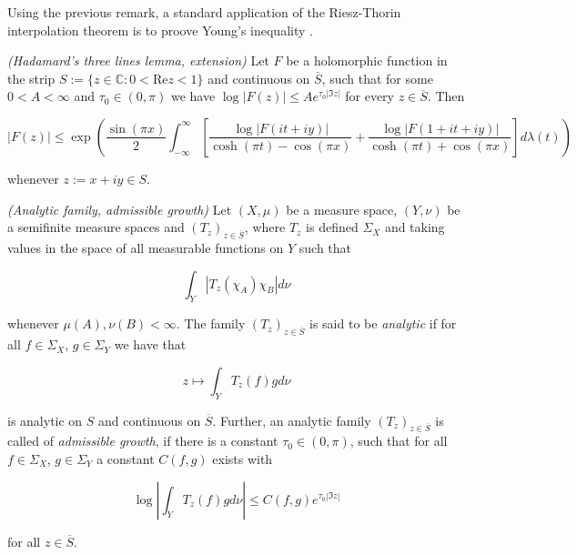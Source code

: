 \begin{remark*}
	Using the previous remark, a standard application of the Riesz-Thorin interpolation theorem is to proove Young's inequality \textup{\cite[22--23]{grafakos:fourier:2014}}.
\end{remark*}

\begin{mdframed}
	\begin{lemma}\emph{(Hadamard's three lines lemma, extension)}
		Let $F$ be a holomorphic function in the strip $S := \{z \in \mathbb{C}: 0 < \mathrm{Re}z < 1\}$ and continuous on $\overline{S}$, such that for some $0 < A < \infty$ and $\tau_0 \in (0,\pi)$ we have $\log \vert F(z)\vert \leqslant A e^{\tau_0 \vert \Im z \vert}$ for every $z \in \overline{S}$. Then

			\begin{equation*}
				\vert F(z) \vert \leqslant \exp\left( \frac{\sin(\pi x)}{2} \int_{-\infty}^\infty \left[ \frac{\log \vert F(it + iy)\vert}{\cosh(\pi t) - \cos(\pi x)} + \frac{\log \vert F(1 + it + iy)\vert}{\cosh(\pi t) + \cos(\pi x)} \right] d\lambda(t)\right)
			\end{equation*}

			whenever $z := x + iy \in S$.
			\label{lem:EHTL}
	\end{lemma}
\end{mdframed}

\vspace{2mm}

\begin{mdframed}
	\begin{definition}\emph{(Analytic family, admissible growth)}
		Let $(X,\mu)$ be a measure space, $(Y,\nu)$ be a semifinite measure spaces and $\left( T_z \right)_{z \in \overline{S}}$, where $T_z$ is defined $\Sigma_X$ and taking values in the space of all measurable functions on $Y$ such that

		\begin{equation}
			\int_Y \left| T_z(\chi_A)\chi_B \right| d\nu
		\end{equation}

		whenever $\mu(A),\nu(B) < \infty$. The family $\left( T_z \right)_{z \in \overline{S}}$ is said to be \emph{analytic} if for all $f \in \Sigma_X$, $g \in \Sigma_Y$ we have that

		\begin{equation}
			z \mapsto \int_Y T_z(f)gd\nu
		\end{equation}

		is analytic on $S$ and continuous on $\overline{S}$. Further, an analytic family $\left( T_z \right)_{z \in \overline{S}}$ is called of \emph{admissible growth}, if there is a constant $\tau_0 \in (0,\pi)$, such that for all $f \in \Sigma_X$, $g \in \Sigma_Y$ a constant $C(f,g)$ exists with

			\begin{equation}
				\log\left| \int_Y T_z(f) g d\nu\right| \leqslant C(f,g)e^{\tau_0\left| \Im z\right|}
			\end{equation}

			for all $z \in \overline{S}$.
	\end{definition}
\end{mdframed}

